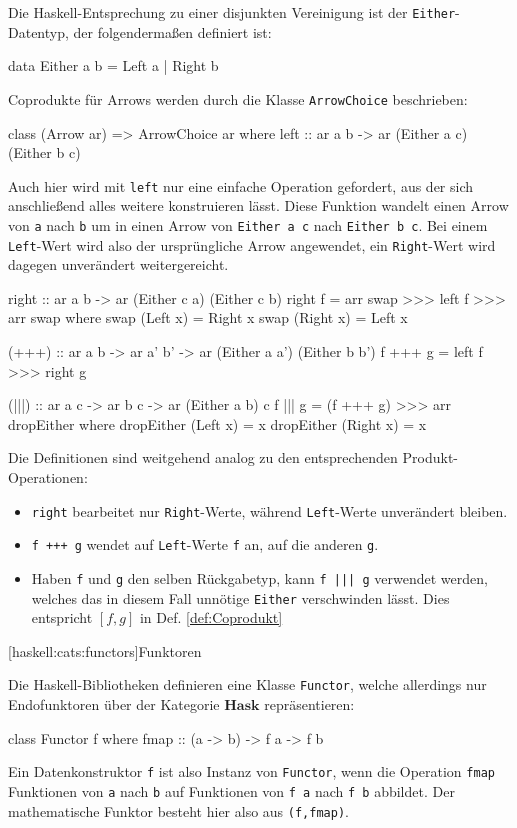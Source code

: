 \documentclass[11pt, a4paper, bibgerm]{book}
\newcommand\icode[1]{\lstinline?#1?}
\newcommand\lsubsection{}
\newcommand{\dref}[1]{Def. \ref{def:#1}}
\begin{document}
Die Haskell-Entsprechung zu einer disjunkten Vereinigung ist der
\icode{Either}-Datentyp, der folgendermaßen definiert ist:
\begin{code}
data Either a b = Left a | Right b
\end{code}
Coprodukte für Arrows werden durch die Klasse \icode{ArrowChoice} beschrieben:
\begin{code}
class (Arrow ar) => ArrowChoice ar where
  left :: ar a b -> ar (Either a c) (Either b c)
\end{code}
Auch hier wird mit \icode{left} nur eine einfache Operation gefordert,
aus der sich anschließend alles weitere konstruieren lässt. Diese
Funktion wandelt einen Arrow von \icode{a} nach \icode{b} um in
einen Arrow von \icode{Either a c} nach \icode{Either b c}. Bei einem
\icode{Left}-Wert wird also der ursprüngliche Arrow angewendet, ein
\icode{Right}-Wert wird dagegen unverändert weitergereicht.
\begin{code}
  right :: ar a b -> ar (Either c a) (Either c b)
  right f = arr swap >>> left f >>> arr swap
    where swap (Left x)  = Right x
          swap (Right x) = Left x

  (+++) :: ar a b -> ar a' b' -> ar (Either a a') (Either b b')
  f +++ g = left f >>> right g

  (|||) :: ar a c -> ar b c -> ar (Either a b) c
  f ||| g = (f +++ g) >>> arr dropEither
    where dropEither (Left x)  = x
          dropEither (Right x) = x

\end{code} %
Die Definitionen sind weitgehend analog zu den entsprechenden
Produkt-Operationen:
\begin{itemize}
\item \icode{right} bearbeitet nur \icode{Right}-Werte, während
  \icode{Left}-Werte unverändert bleiben.
\item \icode{f +++ g} wendet auf \icode{Left}-Werte \icode{f} an, auf
  die anderen \icode{g}.
\item Haben \icode{f} und \icode{g} den selben Rückgabetyp, kann
  \icode{f ||| g} verwendet werden, welches das in diesem Fall unnötige
  \icode{Either} verschwinden lässt. Dies entspricht $[f,g]$ in
  \dref{Coprodukt}
\end{itemize}

\lsubsection[haskell:cats:functors]{Funktoren}

Die Haskell-Bibliotheken definieren eine Klasse \icode{Functor}, welche
allerdings nur Endofunktoren über der Kategorie $\mathbf{Hask}$ repräsentieren:
\begin{code}
class Functor f where
  fmap :: (a -> b) -> f a -> f b
\end{code}
Ein Datenkonstruktor \icode{f} ist also Instanz von \icode{Functor},
wenn die Operation \icode{fmap} Funktionen von \icode{a} nach \icode{b}
auf Funktionen von \icode{f a} nach \icode{f b} abbildet. Der
mathematische Funktor besteht hier also aus \icode{(f,fmap)}.
\end{document}
